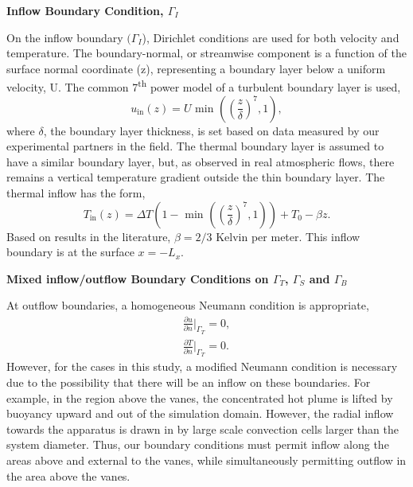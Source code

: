 \textbf{Inflow Boundary Condition, $\Gamma_I$} 

On the inflow boundary $(\Gamma_I$), Dirichlet conditions are used for
both velocity and temperature. The boundary-normal, or streamwise
component is a function of the surface normal coordinate (z),
representing a boundary layer below a uniform velocity, U.
The common 7\textsuperscript{th} power model of a turbulent boundary
layer is used,    
\begin{equation*}
  u_{\text{in}}(z) = U \text{ min }\left(\left(\frac{z}{\delta}\right)^7,1\right),
  \label{eq:bl_u}
\end{equation*}
where $\delta$, the boundary layer thickness, is set based on data
measured by our experimental partners in the field. 
The thermal boundary layer is assumed to have a similar boundary layer,
but, as observed in real atmospheric flows, there remains a vertical
temperature gradient outside the thin boundary layer. 
The thermal inflow has the form,
\begin{equation*}
  T_{\text{in}}(z) = \Delta T \left(1- \text{ min
			}\left(\left(\frac{z}{\delta}\right)^7,1\right)\right)
  + T_0 - \beta z.  
  \label{eq:bl_t}
\end{equation*}
Based on results in the literature, $\beta = 2/3$ Kelvin per 
meter\cite{Blocken2007238}.
This inflow boundary is at the surface $x=-L_x$.

\textbf{Mixed inflow/outflow Boundary Conditions on $\Gamma_T$,
$\Gamma_S$ and $\Gamma_B$}  

At outflow boundaries, a homogeneous Neumann condition is
appropriate\cite{Rannacher2000}, 
\begin{align}
  \frac{\partial u}{\partial n}\bigg|_{\Gamma_T} = 0, \\
  \frac{\partial T}{\partial n}\bigg|_{\Gamma_T} = 0.
\end{align}
However, for the cases in this study, a modified Neumann condition is
necessary due to the possibility that there will be an inflow on these
boundaries. 
For example, in the region above the vanes, the concentrated hot plume is
lifted by buoyancy upward and out of the simulation domain. However, the
radial inflow towards the apparatus is drawn in by large scale
convection cells larger than the system diameter. Thus, our boundary
conditions must permit inflow along the areas above and external to the
vanes, while simultaneously permitting outflow in the area above the vanes. 


